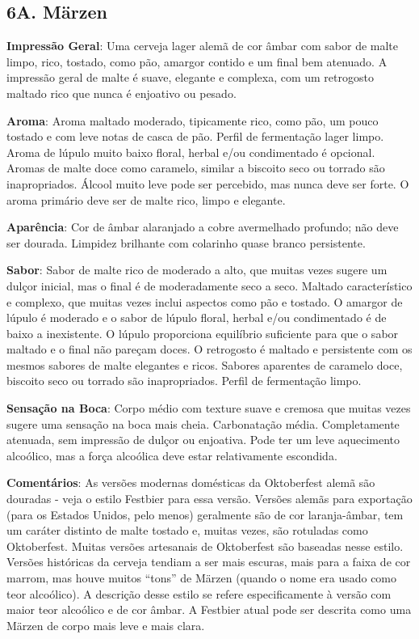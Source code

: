 \subsection*{6A. Märzen}
\textbf{Impressão Geral}: Uma cerveja lager alemã de cor âmbar com sabor de malte limpo, rico, tostado, como pão, amargor contido e um final bem atenuado. A impressão geral de malte é suave, elegante e complexa, com um retrogosto maltado rico que nunca é enjoativo ou pesado.

\textbf{Aroma}: Aroma maltado moderado, tipicamente rico, como pão, um pouco tostado e com leve notas de casca de pão. Perfil de fermentação lager limpo. Aroma de lúpulo muito baixo floral, herbal e/ou condimentado é opcional. Aromas de malte doce como caramelo, similar a biscoito seco ou torrado são inapropriados. Álcool muito leve pode ser percebido, mas nunca deve ser forte. O aroma primário deve ser de malte rico, limpo e elegante.

\textbf{Aparência}: Cor de âmbar alaranjado a cobre avermelhado profundo; não deve ser dourada. Limpidez brilhante com colarinho quase branco persistente.

\textbf{Sabor}: Sabor de malte rico de moderado a alto, que muitas vezes sugere um dulçor inicial, mas o final é de moderadamente seco a seco. Maltado característico e complexo, que muitas vezes inclui aspectos como pão e tostado. O amargor de lúpulo é moderado e o sabor de lúpulo floral, herbal e/ou condimentado é de baixo a inexistente. O lúpulo proporciona equilíbrio suficiente para que o sabor maltado e o final não pareçam doces. O retrogosto é maltado e persistente com os mesmos sabores de malte elegantes e ricos. Sabores aparentes de caramelo doce, biscoito seco ou torrado são inapropriados. Perfil de fermentação limpo.

\textbf{Sensação na Boca}: Corpo médio com texture suave e cremosa que muitas vezes sugere uma sensação na boca mais cheia. Carbonatação média. Completamente atenuada, sem impressão de dulçor ou enjoativa. Pode ter um leve aquecimento alcoólico, mas a força alcoólica deve estar relativamente escondida.

\textbf{Comentários}: As versões modernas domésticas da Oktoberfest alemã são douradas - veja o estilo Festbier para essa versão. Versões alemãs para exportação (para os Estados Unidos, pelo menos) geralmente são de cor laranja-âmbar, tem um caráter distinto de malte tostado e, muitas vezes, são rotuladas como Oktoberfest. Muitas versões artesanais de Oktoberfest são baseadas nesse estilo. Versões históricas da cerveja tendiam a ser mais escuras, mais para a faixa de cor marrom, mas houve muitos “tons” de Märzen (quando o nome era usado como teor alcoólico). A descrição desse estilo se refere especificamente à versão com maior teor alcoólico e de cor âmbar. A Festbier atual pode ser descrita como uma Märzen de corpo mais leve e mais clara.

